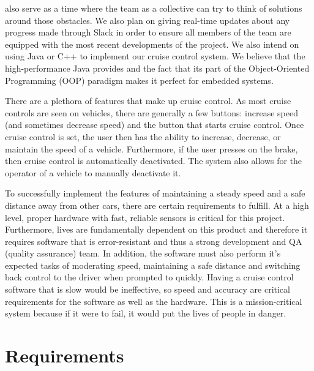 \documentclass[preprint,11pt,3p]{article}
\begin{document}
also serve as a time where the team as a collective can try to think of solutions
around those obstacles. We also plan on giving real-time updates about any
progress made through Slack in order to ensure all members of the team are
equipped with the most recent developments of the project. We also intend on
using Java or C++ to implement our cruise control system. We believe that the
high-performance Java provides and the fact that its part of the Object-Oriented
Programming (OOP) paradigm makes it perfect for embedded systems. \par
There are a plethora of features that make up cruise control. As most cruise
controls are seen on vehicles, there are generally a few buttons: increase speed
(and sometimes decrease speed) and the button that starts cruise control. Once
cruise control is set, the user then has the ability to increase, decrease, or
maintain the speed of a vehicle. Furthermore, if the user presses on the brake,
then cruise control is automatically deactivated. The system also allows for the
operator of a vehicle to manually deactivate it. \par
To successfully implement the features of maintaining a steady speed and a
safe distance away from other cars, there are certain requirements to fulfill. At a
high level, proper hardware with fast, reliable sensors is critical for this project.
Furthermore, lives are fundamentally dependent on this product and therefore
it requires software that is error-resistant and thus a strong development and
QA (quality assurance) team. In addition, the software must also perform it’s
expected tasks of moderating speed, maintaining a safe distance and switching
back control to the driver when prompted to quickly. Having a cruise control
software that is slow would be ineffective, so speed and accuracy are critical
requirements for the software as well as the hardware. This is a mission-critical
system because if it were to fail, it would put the lives of people in danger.

\newpage
\section{Requirements}
\end{document}
